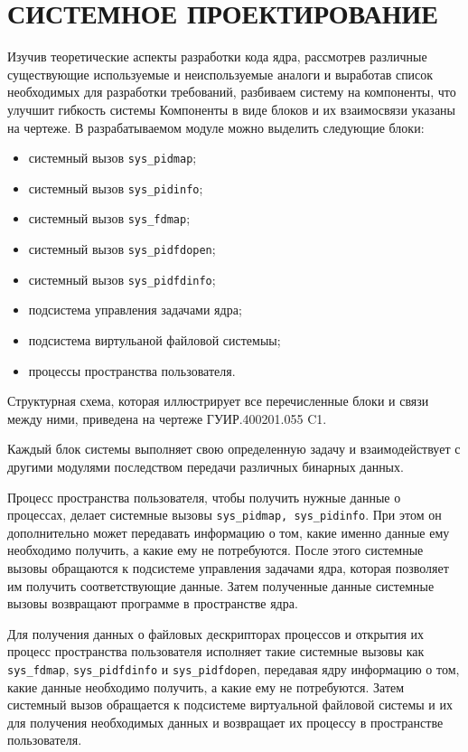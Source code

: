 \section{СИСТЕМНОЕ ПРОЕКТИРОВАНИЕ}
\label{sec:sys}

Изучив теоретические аспекты разработки кода ядра, рассмотрев различные
существующие используемые и неиспользуемые аналоги и выработав список
необходимых для разработки требований, разбиваем систему на компоненты, что
улучшит гибкость системы
Компоненты в виде блоков и их взаимосвязи указаны на чертеже.
В разрабатываемом модуле можно выделить следующие блоки:
\begin{itemize}
\item системный вызов \texttt{sys\_pidmap};
\item системный вызов \texttt{sys\_pidinfo};
\item системный вызов \texttt{sys\_fdmap};
\item системный вызов \texttt{sys\_pidfdopen};
\item системный вызов \texttt{sys\_pidfdinfo};
\item подсистема управления задачами ядра;
\item подсистема виртульаной файловой системыы;
\item процессы пространства пользователя.
\end{itemize}

Структурная схема, которая иллюстрирует все перечисленные блоки и связи
между ними, приведена на чертеже ГУИР.400201.055 C1.

Каждый блок системы выполняет свою определенную задачу и взаимодействует с
другими модулями последством передачи различных бинарных данных. 

Процесс пространства пользователя, чтобы получить нужные данные о процессах,
делает системные вызовы \texttt{sys\_pidmap, sys\_pidinfo}.
При этом он дополнительно может передавать информацию о том, какие именно данные
ему необходимо получить, а какие ему не потребуются.
После этого системные вызовы обращаются к подсистеме управления задачами ядра,
которая позволяет им получить соответствующие данные. Затем полученные данные
системные вызовы возвращают программе в пространстве ядра. 

Для получения данных о файловых дескрипторах процессов и открытия их процесс
пространства пользователя исполняет такие системные вызовы как
\texttt{sys\_fdmap}, \texttt{sys\_pidfdinfo} и \texttt{sys\_pidfdopen},
передавая ядру информацию о том, какие данные необходимо получить, а какие ему
не потребуются. Затем системный вызов обращается к подсистеме виртуальной
файловой системы и их для получения необходимых данных и возвращает их процессу
в пространстве пользователя.

